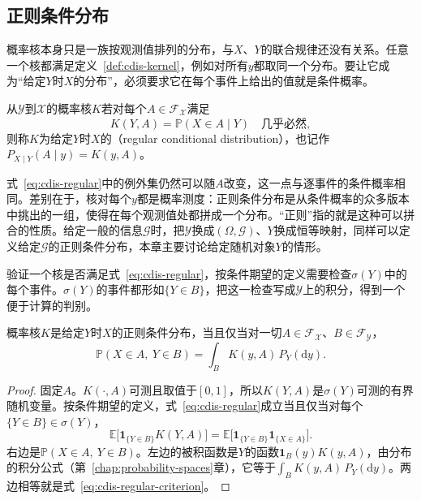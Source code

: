 \subsection{正则条件分布}
\label{sec:cdis-regular}

概率核本身只是一族按观测值排列的分布，与$X$、$Y$的联合规律还没有关系。任意一个核都满足定义~\ref{def:cdis-kernel}，例如对所有$y$都取同一个分布。要让它成为“给定$Y$时$X$的分布”，必须要求它在每个事件上给出的值就是条件概率。

\begin{definition}[正则条件分布]
\label{def:cdis-regular}
从$\mathcal{Y}$到$\mathcal{X}$的概率核$K$若对每个$A\in\mathcal{F}_{\mathcal{X}}$满足
\begin{equation}
 K(Y,A)=\mathbb{P}(X\in A\mid Y)\quad\text{几乎必然},
 \label{eq:cdis-regular}
\end{equation}
则称$K$为给定$Y$时$X$的（regular conditional distribution），也记作$P_{X\mid Y}(A\mid y)=K(y,A)$。
\end{definition}

式~\eqref{eq:cdis-regular}中的例外集仍然可以随$A$改变，这一点与逐事件的条件概率相同。差别在于，核对每个$y$都是概率测度：正则条件分布是从条件概率的众多版本中挑出的一组，使得在每个观测值处都拼成一个分布。“正则”指的就是这种可以拼合的性质。给定一般的信息$\mathcal{G}$时，把$\mathcal{Y}$换成$(\Omega,\mathcal{G})$、$Y$换成恒等映射，同样可以定义给定$\mathcal{G}$的正则条件分布，本章主要讨论给定随机对象$Y$的情形。

验证一个核是否满足式~\eqref{eq:cdis-regular}，按条件期望的定义需要检查$\sigma(Y)$中的每个事件。$\sigma(Y)$的事件都形如$\{Y\in B\}$，把这一检查写成$\mathcal{Y}$上的积分，得到一个便于计算的判别。

\begin{lemma}[正则条件分布的积分判别]
\label{lem:cdis-regular-criterion}
概率核$K$是给定$Y$时$X$的正则条件分布，当且仅当对一切$A\in\mathcal{F}_{\mathcal{X}}$、$B\in\mathcal{F}_{\mathcal{Y}}$，
\begin{equation}
 \mathbb{P}(X\in A,\ Y\in B)=\int_{B}K(y,A)\,P_Y(\mathrm{d}y).
 \label{eq:cdis-regular-criterion}
\end{equation}
\end{lemma}

\begin{proof}
固定$A$。$K(\cdot,A)$可测且取值于$[0,1]$，所以$K(Y,A)$是$\sigma(Y)$可测的有界随机变量。按条件期望的定义，式~\eqref{eq:cdis-regular}成立当且仅当对每个$\{Y\in B\}\in\sigma(Y)$，
\[
 \mathbb{E}\bigl[\mathbf{1}_{\{Y\in B\}}K(Y,A)\bigr]=\mathbb{E}\bigl[\mathbf{1}_{\{Y\in B\}}\mathbf{1}_{\{X\in A\}}\bigr].
\]
右边是$\mathbb{P}(X\in A,\ Y\in B)$。左边的被积函数是$Y$的函数$\mathbf{1}_{B}(y)K(y,A)$，由分布的积分公式（第~\ref{chap:probability-spaces}章），它等于$\int_{B}K(y,A)\,P_Y(\mathrm{d}y)$。两边相等就是式~\eqref{eq:cdis-regular-criterion}。
\end{proof}

